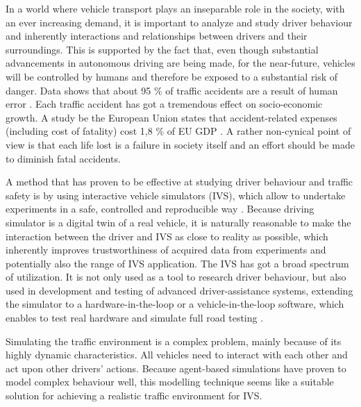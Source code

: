 \documentclass[titlepage, 12pt]{article}
\begin{document}
In a world where vehicle transport plays an inseparable role in the society, with an ever increasing
demand, it is important to analyze and study driver behaviour and inherently interactions and
relationships between drivers and their surroundings. This is supported by the fact that, even though
substantial advancements in autonomous driving are being made, for the near-future, vehicles 
will be controlled by humans and therefore be exposed to a substantial risk of danger. 
Data shows that about 95 \% of traffic accidents are a result of human error \cite{Parliament2021}. 
Each traffic accident has got a tremendous effect on socio-economic growth. A study be the European
Union states that accident-related expenses (including cost of fatality) cost 1,8 \% of EU GDP \cite{Wijnen2017}.  
A rather non-cynical point of view is that each life lost is a failure in society itself and an effort
should be made to diminish fatal accidents.

A method that has proven to be effective at studying driver behaviour and
traffic safety is by using interactive vehicle simulators (IVS), which allow to
undertake experiments in a safe, controlled and reproducible way \cite{Winter2012}.  Because
driving simulator is a digital twin of a real vehicle, it is naturally
reasonable to make the interaction between the driver and IVS as close to
reality as possible, which inherently improves trustworthiness of acquired data from experiments
and potentially also the range of IVS application. The IVS has got a broad
spectrum of utilization. It is not only used as a tool to research driver
behaviour, but also used in development and testing of advanced
driver-assistance systems, extending the simulator to a hardware-in-the-loop or
a vehicle-in-the-loop software, which enables to test real hardware and simulate
full road testing \cite{Horvath2019}.

Simulating the traffic environment is a complex problem, mainly because of
its highly dynamic characteristics. All vehicles  need to interact with
each other and act upon other drivers' actions. Because agent-based simulations
have proven to model complex behaviour well, this modelling technique seems like
a suitable solution for achieving a realistic traffic environment for IVS.










\end{document}
